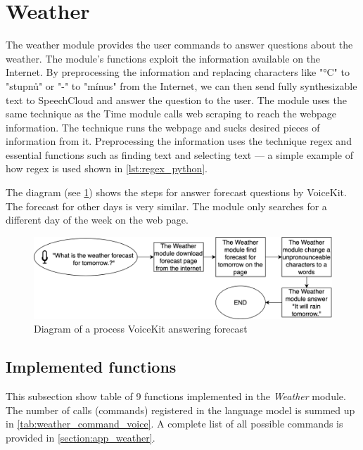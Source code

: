 \section{Weather}

The weather module provides the user commands to answer questions about the weather. The module's functions exploit the information available on the Internet. By preprocessing the information and replacing characters like "°C" to "stupnů" or "-" to "mínus" from the Internet, we can then send fully synthesizable text to SpeechCloud and answer the question to the user. The module uses the same technique as the Time module calls web scraping to reach the webpage information. The technique runs the webpage and sucks desired pieces of information from it. Preprocessing the information uses the technique regex and essential functions such as finding text and selecting text — a simple example of how regex is used shown in \cref{lst:regex_python}.

% 

The diagram (see \cref{fig:forecast_weather_diagram}) shows the steps for answer forecast questions by VoiceKit. The forecast for other days is very similar. The module only searches for a different day of the week on the web page. 

\begin{figure}[H]
    \centering
    \includegraphics[width=\textwidth]{img/forecast_weather_diagram.png}
    \caption{Diagram of a process VoiceKit answering forecast}
    \label{fig:forecast_weather_diagram}
\end{figure}

\subsection{Implemented functions}

This subsection show table of 9 functions implemented in the \textit{Weather} module. The number of calls (commands) registered in the language model is summed up in \cref{tab:weather_command_voice}. A complete list of all possible commands is provided in \cref{section:app_weather}.

